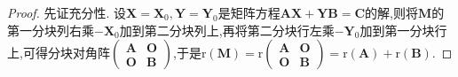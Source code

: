 \documentclass[../../main.tex]{subfiles}%
\begin{document}
\begin{proof}
先证充分性. 设\(\boldsymbol{X}=\boldsymbol{X}_0,\boldsymbol{Y}=\boldsymbol{Y}_0\)是矩阵方程\(\boldsymbol{A}\boldsymbol{X}+\boldsymbol{Y}\boldsymbol{B}=\boldsymbol{C}\)的解,则将\(\boldsymbol{M}\)的第一分块列右乘\(-\boldsymbol{X}_0\)加到第二分块列上,再将第二分块行左乘\(-\boldsymbol{Y}_0\)加到第一分块行上,可得分块对角阵\(\begin{pmatrix}
\boldsymbol{A}&\boldsymbol{O}\\
\boldsymbol{O}&\boldsymbol{B}
\end{pmatrix}\),于是\(\mathrm{r}(\boldsymbol{M})=\mathrm{r}\begin{pmatrix}
\boldsymbol{A}&\boldsymbol{O}\\
\boldsymbol{O}&\boldsymbol{B}
\end{pmatrix}=\mathrm{r}(\boldsymbol{A})+\mathrm{r}(\boldsymbol{B})\).


\end{proof}
\end{document}
